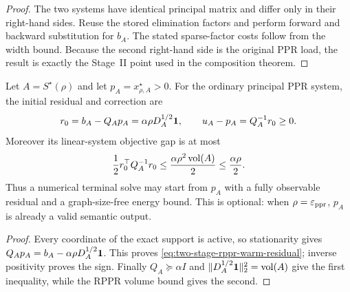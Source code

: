 \begin{proof}
The two systems have identical principal matrix and differ only in their
right-hand sides.  Reuse the stored elimination factors and perform forward
and backward substitution for $b_A$.  The stated sparse-factor costs follow
from the width bound.  Because the second right-hand side is the original PPR
load, the result is exactly the Stage~II point used in the composition
theorem.
\end{proof}

\begin{corollary}
\label{cor:two-stage-rppr-warm-start}
Let $A=S^\star(\rho)$ and let $p_A=x_{\rho,A}^\star>0$.  For the ordinary
principal PPR system, the initial residual and correction are
\begin{equation}
 r_0=b_A-Q_Ap_A=\alpha\rho D_A^{1/2}\mathbf{1},
 \qquad
 u_A-p_A=Q_A^{-1}r_0\geq0.
 \label{eq:two-stage-rppr-warm-residual}
\end{equation}
Moreover its linear-system objective gap is at most
\begin{equation*}
 \frac12 r_0^\top Q_A^{-1}r_0
 \leq\frac{\alpha\rho^2\operatorname{vol}(A)}2
 \leq\frac{\alpha\rho}{2}.
\end{equation*}
Thus a numerical terminal solve may start from $p_A$ with a fully observable
residual and a graph-size-free energy bound.  This is optional: when
$\rho=\varepsilon_{\mathrm{ppr}}$, $p_A$ is already a valid semantic output.
\end{corollary}

\begin{proof}
Every coordinate of the exact support is active, so stationarity gives
$Q_Ap_A=b_A-\alpha\rho D_A^{1/2}\mathbf{1}$.  This proves
\cref{eq:two-stage-rppr-warm-residual}; inverse positivity proves the sign.
Finally $Q_A\succeq\alpha I$ and
$\lVert D_A^{1/2}\mathbf{1}\rVert_2^2=\operatorname{vol}(A)$ give the first inequality, while the RPPR
volume bound gives the second.
\end{proof}

